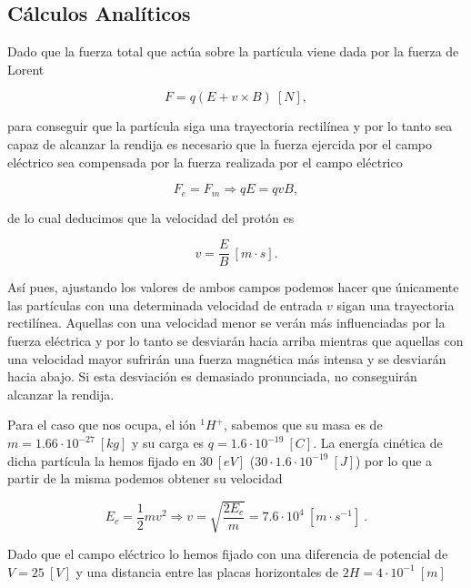 \documentclass[journal]{IEEEtran}
\begin{document}
\subsection{Cálculos Analíticos}

Dado que la fuerza total que actúa sobre la partícula viene dada por la fuerza de Lorent

\begin{equation}
    F = q(E + v \times B)~[N],
\end{equation}

para conseguir que la partícula siga una trayectoria rectilínea y por lo tanto sea capaz de alcanzar la rendija es necesario que la fuerza ejercida por el campo eléctrico sea compensada por la fuerza realizada por el campo eléctrico

\begin{equation}
    F_e = F_m \Rightarrow qE = qvB,
\end{equation}

de lo cual deducimos que la velocidad del protón es

\begin{equation}
    v = \displaystyle\frac{E}{B}~[m\cdot s].
\end{equation}

Así pues, ajustando los valores de ambos campos podemos hacer que únicamente las partículas con una determinada velocidad de entrada $v$ sigan una trayectoria rectilínea. Aquellas con una velocidad menor se verán más influenciadas por la fuerza eléctrica y por lo tanto se desviarán hacia arriba mientras que aquellas con una velocidad mayor sufrirán una fuerza magnética más intensa y se desviarán hacia abajo. Si esta desviación es demasiado pronunciada, no conseguirán alcanzar la rendija.

Para el caso que nos ocupa, el ión $^1H^+$, sabemos que su masa es de $m = 1.66\cdot 10^{-27}~[kg]$ y su carga es $q = 1.6 \cdot 10^{-19}~[C]$. La energía cinética de dicha partícula la hemos fijado en $30~[eV]$ ($30\cdot 1.6\cdot 10^{-19}~[J]$) por lo que a partir de la misma podemos obtener su velocidad

\begin{equation}
    E_c = \displaystyle\frac{1}{2}mv^2 \Rightarrow v = \sqrt{\displaystyle\frac{2E_c}{m}} = 7.6\cdot 10^4~[m\cdot s^{-1}]~.
\end{equation}

Dado que el campo eléctrico lo hemos fijado con una diferencia de potencial de $V = 25~[V]$ y una distancia entre las placas horizontales de $2H = 4\cdot 10^{-1}~[m]$
\end{document}
